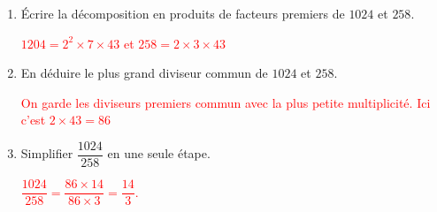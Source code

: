         \begin{enumerate}
            \item Écrire la décomposition en produits de facteurs premiers de $\num{1024}$ et $258$.

            \textcolor{red}{
                $\num{1204} = 2^2\times 7\times 43$ et $258=2\times 3\times 43$
            }
            \item En déduire le plus grand diviseur commun de $\num{1024}$ et $258$.

            \textcolor{red}{
                On garde les diviseurs premiers commun avec la plus petite multiplicité.
                Ici c'est $2\times 43 = 86$
            }
            \item Simplifier $\dfrac{\num{1024}}{258}$ en une seule étape.

            \textcolor{red}{
                $\dfrac{\num{1024}}{258}=\dfrac{86\times 14}{86\times 3}=\dfrac{14}{3}$.
            }
        \end{enumerate}
